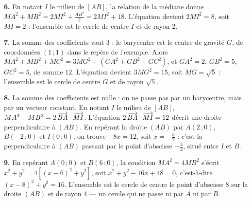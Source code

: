 \begin{corrige}
\textbf{6.} En notant $I$ le milieu de $[AB]$, la relation de la médiane donne
$MA^{2}+MB^{2} = 2MI^{2}+\frac{AB^{2}}{2} = 2MI^{2}+18$. L'équation devient
$2MI^{2} = 8$, soit $MI = 2$ : l'ensemble est le cercle de centre $I$ et de
rayon $2$.

\textbf{7.} La somme des coefficients vaut $3$ : le barycentre est le centre
de gravité $G$, de coordonnées $(1\,;1)$ dans le repère de l'exemple. Alors
$MA^{2}+MB^{2}+MC^{2} = 3MG^{2}+\left(GA^{2}+GB^{2}+GC^{2}\right)$, et
$GA^{2} = 2$, $GB^{2} = 5$, $GC^{2} = 5$, de somme $12$. L'équation devient
$3MG^{2} = 15$, soit $MG = \sqrt5$ : l'ensemble est le cercle de centre $G$ et
de rayon $\sqrt5$.

\textbf{8.} La somme des coefficients est nulle : on ne passe pas par un
barycentre, mais par un vecteur constant. En notant $I$ le milieu de $[AB]$,
$MA^{2}-MB^{2} = 2\,\overrightarrow{BA} \cdot \overrightarrow{MI}$. L'équation
$2\,\overrightarrow{BA} \cdot \overrightarrow{MI} = 12$ décrit une droite perpendiculaire à
$(AB)$. En repérant la droite $(AB)$ par $A(2\,;0)$, $B(-2\,;0)$ et
$I(0\,;0)$, on trouve $-8x = 12$, soit $x = -\frac32$ : c'est la
perpendiculaire à $(AB)$ passant par le point d'abscisse $-\frac32$, situé
entre $I$ et $B$.

\textbf{9.} En repérant $A(0\,;0)$ et $B(6\,;0)$, la condition
$MA^{2} = 4MB^{2}$ s'écrit $x^{2}+y^{2} = 4\left[(x-6)^{2}+y^{2}\right]$, soit
$x^{2}+y^{2}-16x+48 = 0$, c'est-à-dire $(x-8)^{2}+y^{2} = 16$. L'ensemble est
le cercle de centre le point d'abscisse $8$ sur la droite $(AB)$ et de rayon
$4$ — un cercle qui ne passe ni par $A$ ni par $B$.
\end{corrige}

